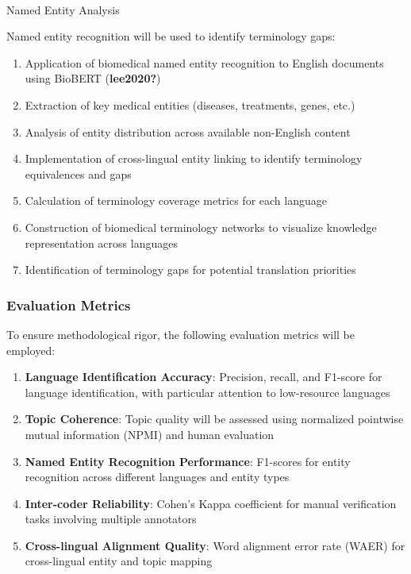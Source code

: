 \documentclass[
]{article}
\makeatletter
\let\oldparagraph\paragraph
\renewcommand{\paragraph}{
    \@ifstar
      \xxxParagraphStar
      \xxxParagraphNoStar
  }
\newcommand{\xxxParagraphStar}[1]{\oldparagraph*{#1}\mbox{}}
\newcommand{\xxxParagraphNoStar}[1]{\oldparagraph{#1}\mbox{}}
\providecommand{\tightlist}{%
  \setlength{\itemsep}{0pt}\setlength{\parskip}{0pt}}\usepackage{longtable,booktabs,array}
\makeatother
\begin{document}
\paragraph{Named Entity Analysis}\label{named-entity-analysis}

Named entity recognition will be used to identify terminology gaps:

\begin{enumerate}
\def\labelenumi{\arabic{enumi}.}
\tightlist
\item
  Application of biomedical named entity recognition to English
  documents using BioBERT (\textbf{lee2020?})
\item
  Extraction of key medical entities (diseases, treatments, genes, etc.)
\item
  Analysis of entity distribution across available non-English content
\item
  Implementation of cross-lingual entity linking to identify terminology
  equivalences and gaps
\item
  Calculation of terminology coverage metrics for each language
\item
  Construction of biomedical terminology networks to visualize knowledge
  representation across languages
\item
  Identification of terminology gaps for potential translation
  priorities
\end{enumerate}

\subsubsection{Evaluation Metrics}\label{evaluation-metrics}

To ensure methodological rigor, the following evaluation metrics will be
employed:

\begin{enumerate}
\def\labelenumi{\arabic{enumi}.}
\item
  \textbf{Language Identification Accuracy}: Precision, recall, and
  F1-score for language identification, with particular attention to
  low-resource languages
\item
  \textbf{Topic Coherence}: Topic quality will be assessed using
  normalized pointwise mutual information (NPMI) and human evaluation
\item
  \textbf{Named Entity Recognition Performance}: F1-scores for entity
  recognition across different languages and entity types
\item
  \textbf{Inter-coder Reliability}: Cohen's Kappa coefficient for manual
  verification tasks involving multiple annotators
\item
  \textbf{Cross-lingual Alignment Quality}: Word alignment error rate
  (WAER) for cross-lingual entity and topic mapping
\end{enumerate}
\end{document}
